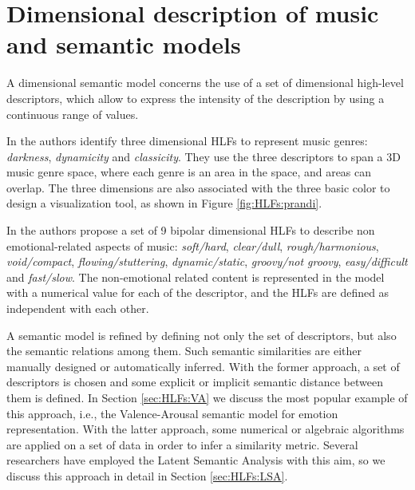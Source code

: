 \section{Dimensional description of music and semantic models}\label{sec:HLFs:models} %
A dimensional semantic model concerns the use of a set of dimensional high-level descriptors, which allow to express the intensity of the description by using a continuous range of values. 

In \cite{Prandi2009} the authors identify three dimensional HLFs to represent music genres: \textit{darkness}, \textit{dynamicity} and \textit{classicity}. They use the three descriptors to span a 3D music genre space, where each genre is an area in the space, and areas can overlap. The three dimensions are also associated with the three basic color to design a visualization tool, as shown in Figure \ref{fig:HLFs:prandi}. 

In \cite{Buccoli2013} the authors propose a set of 9 bipolar dimensional HLFs to describe non emotional-related aspects of music: \textit{soft/hard}, \textit{clear/dull}, \textit{rough/harmonious}, \textit{void/compact}, \textit{flowing/stuttering}, \textit{dynamic/static}, \textit{groovy/not groovy}, \textit{easy/difficult} and \textit{fast/slow}. The non-emotional related content is represented in the model with a numerical value for each of the descriptor, and the HLFs are defined as independent with each other.


A semantic model is refined by defining not only the set of descriptors, but also the semantic relations among them. Such semantic similarities are either manually designed or automatically inferred. With the former approach, a set of descriptors is chosen and some explicit or implicit semantic distance between them is defined. In Section \ref{sec:HLFs:VA} we discuss the most popular example of this approach, i.e., the Valence-Arousal semantic model for emotion representation. With the latter approach, some numerical or algebraic algorithms are applied on a set of data in order to infer a similarity metric. Several researchers have employed the Latent Semantic Analysis with this aim, so we discuss this approach in detail in Section \ref{sec:HLFs:LSA}.

